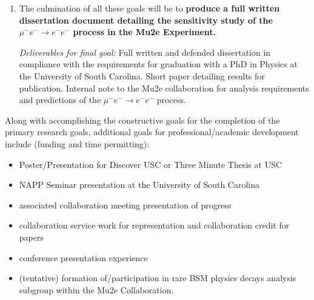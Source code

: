 \documentclass[12pt]{article}
\newcommand{\muEtoEE}{\mu^- e^- \to e^- e^-}
\begin{document}
\begin{enumerate}
\begin{itemize}
    \item Utilizing the results of the above statistical tests, determine the required number of identified channel events required in order to produce results of various significances as well as duration required to match and improve previously achieved sensitivities in the absence of events correcting for background influences.
\end{itemize}
\textit{Deliverables for goal \ref{goal:SensitivityStudyGoal}:} Full detail predictions of anticipated sensitivity to $\muEtoEE$ channel in the Mu2e experiment. Statistical analysis toolbox development for analyzing this particular channel. Calculation of required intensity of proton beam intensity and number of wall clock hours. A formal request for specified run configurations based on these results and an internal note of analyzability of this particular channel given those configurations in the case of run configuration approval during experiment active periods.
 
    \item The culmination of all these goals will be to \textbf{produce a full written dissertation document detailing the sensitivity study of the $\muEtoEE$ process in the Mu2e Experiment.} 

\textit{Deliverables for final goal:} Full written and defended dissertation in compliance with the requirements for graduation with a PhD in Physics at the University of South Carolina. Short paper detailing results for publication. Internal note to the Mu2e collaboration for analysis requirements and predictions of the $\muEtoEE$ process.
\end{enumerate}

Along with accomplishing the constructive goals for the completion of the primary research goals, additional goals for professional/academic development include (funding and time permitting): 
\begin{itemize}
    \item Poster/Presentation for Discover USC or Three Minute Thesis at USC
    \item NAPP Seminar presentation at the University of South Carolina
    \item associated collaboration meeting presentation of progress
    \item collaboration service work for representation and collaboration credit for papers 
    \item conference presentation experience
    \item (tentative) formation of/participation in rare BSM physics decays analysis subgroup within the Mu2e Collaboration. 
\end{itemize}
\end{document}
